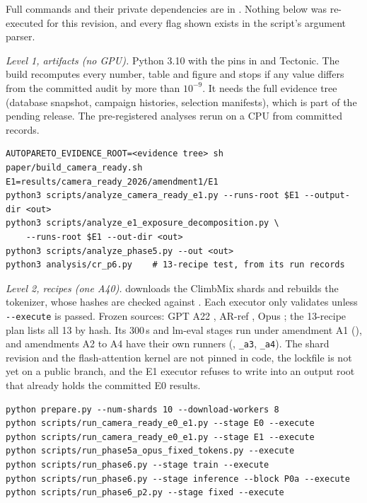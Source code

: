 Full commands and their private dependencies are in . Nothing below was re-executed for this revision, and every flag shown exists in the script's argument parser.

\emph{Level 1, artifacts (no GPU).} Python 3.10 with the pins in  and Tectonic. The build recomputes every number, table and figure and stops if any value differs from the committed audit by more than $10^{-9}$. It needs the full evidence tree (database snapshot, campaign histories, selection manifests), which is part of the pending release. The pre-registered analyses rerun on a CPU from committed records.
\par\begingroup\footnotesize
\begin{verbatim}
AUTOPARETO_EVIDENCE_ROOT=<evidence tree> sh paper/build_camera_ready.sh
E1=results/camera_ready_2026/amendment1/E1
python3 scripts/analyze_camera_ready_e1.py --runs-root $E1 --output-dir <out>
python3 scripts/analyze_e1_exposure_decomposition.py \
    --runs-root $E1 --out-dir <out>
python3 scripts/analyze_phase5.py --out <out>
python3 analysis/cr_p6.py    # 13-recipe test, from its run records
\end{verbatim}
\par\endgroup

\emph{Level 2, recipes (one A40).}  downloads the ClimbMix shards and rebuilds the tokenizer, whose hashes are checked against . Each executor only validates unless \texttt{-{}-execute} is passed. Frozen sources: GPT A22 , AR-ref , Opus ; the 13-recipe plan  lists all 13 by hash. Its 300\,s and lm-eval stages run under amendment A1 (), and amendments A2 to A4 have their own runners (, \texttt{\_a3}, \texttt{\_a4}). The shard revision and the flash-attention kernel are not pinned in code, the lockfile is not yet on a public branch, and the E1 executor refuses to write into an output root that already holds the committed E0 results.
\par\begingroup\footnotesize
\begin{verbatim}
python prepare.py --num-shards 10 --download-workers 8
python scripts/run_camera_ready_e0_e1.py --stage E0 --execute
python scripts/run_camera_ready_e0_e1.py --stage E1 --execute
python scripts/run_phase5a_opus_fixed_tokens.py --execute
python scripts/run_phase6.py --stage train --execute
python scripts/run_phase6.py --stage inference --block P0a --execute
python scripts/run_phase6_p2.py --stage fixed --execute
\end{verbatim}
\par\endgroup

